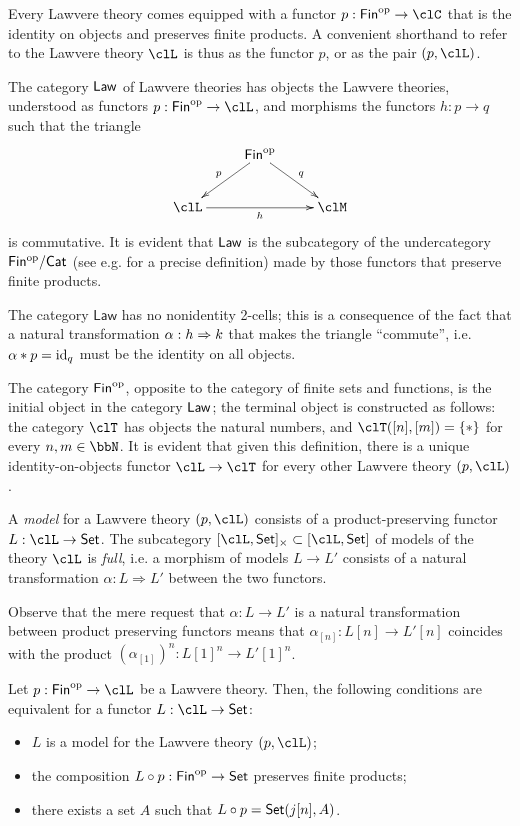 Every Lawvere theory comes equipped with a functor $p : \cate{Fin}^\op \to \clC$ that is the identity on objects and preserves finite products. A convenient shorthand to refer to the Lawvere theory $\clL$ is thus as the functor $p$, or as the pair $(p,\clL)$.
\begin{definition}
	The category $\mathsf{Law}$ of Lawvere theories has objects the Lawvere theories, understood as functors $p : \cate{Fin}^\op \to \clL$, and morphisms the functors $h :  p\to q$ such that the triangle
	\[\xymatrix{
			& \cate{Fin}^\op \ar[dr]^q \ar[dl]_p & \\
			\clL \ar[rr]_h && \clM
		}\]
	is commutative. It is evident that $\mathsf{Law}$ is the subcategory of the undercategory $\mathsf{Fin^{\text{op}}}/\mathsf{Cat}$ (see e.g. \cite[I.6]{McL}for a precise definition) made by those functors that preserve finite products.
\end{definition}
\begin{remark}
	The category $\textsf{Law}$ has no nonidentity 2-cells; this is a consequence of the fact that a natural transformation $\alpha : h \Rightarrow k$ that makes the triangle ``commute'', i.e. $\alpha * p = \text{id}_q$ must be the identity on all objects.
\end{remark}
\begin{example}
	The category $\mathsf{Fin}^{\text{op}}$, opposite to the category of finite sets and functions, is the initial object in the category  $\mathsf{Law}$; the terminal object is constructed as follows: the category $\clT$ has objects the natural numbers, and $\clT([n],[m])=\{*\}$ for every $n,m\in \bbN$. It is evident that given this definition, there is a unique identity-on-objects functor $\clL \to \clT$ for every other Lawvere theory $(p,\clL)$.
\end{example}
\begin{definition}
	A \emph{model} for a Lawvere theory $(p ,\clL)$ consists of a product-preserving functor $L : \clL \to \Set$. The subcategory $[\clL,\Set]_\times \subset [\clL, \Set]$ of models of the theory $\clL$ is \emph{full}, i.e. a morphism of models $L \to L'$ consists of a natural transformation $\alpha : L \Rightarrow L'$ between the two functors.
\end{definition}
Observe that the mere request that $\alpha : L \to L'$ is a natural transformation between product preserving functors means that $\alpha_{[n]} : L[n] \to L'[n]$ coincides with the product $(\alpha_{[1]})^n : L[1]^n \to L'[1]^n$.
\begin{proposition}
	Let $p : \cate{Fin}^\op\to \clL$ be a Lawvere theory. Then, the following conditions are equivalent for a functor $L : \clL \to \Set$:
	\begin{itemize}
		\item $L$ is a model for the Lawvere theory $(p,\clL)$;
		\item the composition $L\circ p : \mathsf{Fin}^{\text{op}} \to \mathsf{Set}$ preserves finite products;
		\item there exists a set $A$ such that $L\circ p = \mathsf{Set}(j[n],A)$.
	\end{itemize}
\end{proposition}
